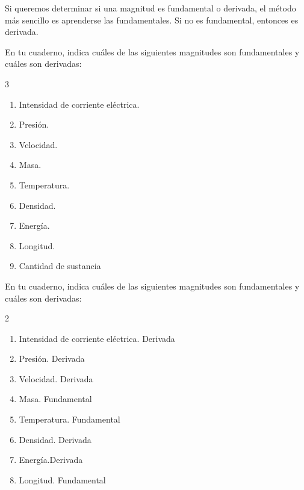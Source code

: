 \begin{remark}
    Si queremos determinar si una magnitud es fundamental o derivada, el método más sencillo es aprenderse las fundamentales.
    Si no es fundamental, entonces es derivada.
\end{remark}

\begin{exercise}
    En tu cuaderno, indica cuáles de las siguientes magnitudes son fundamentales y cuáles son derivadas:
    \vspace*{-12pt}
    \begin{multicols}{3}
        \begin{enumerate}[label=\letraminuscula]
            \item Intensidad de corriente eléctrica.
            \item Presión.
            \item Velocidad.
            \item Masa.
            \item Temperatura.
            \item Densidad.
            \item Energía.
            \item Longitud.
            \item Cantidad de sustancia
        \end{enumerate}
    \end{multicols}
    \begin{solu}
        En tu cuaderno, indica cuáles de las siguientes magnitudes son fundamentales y cuáles son derivadas:
        \begin{multicols}{2}
            \begin{enumerate}[label=\letraminuscula]
            \item Intensidad de corriente eléctrica. \textcolor{ocre}{Derivada}
            \item Presión. \textcolor{ocre}{Derivada}
            \item Velocidad. \textcolor{ocre}{Derivada}
            \item Masa. \textcolor{ocre}{Fundamental}
            \item Temperatura. \textcolor{ocre}{Fundamental}
            \item Densidad. \textcolor{ocre}{Derivada}
            \item Energía.\textcolor{ocre}{Derivada}
            \item Longitud. \textcolor{ocre}{Fundamental}
            \end{enumerate}
        \end{multicols}
    \end{solu}
\end{exercise}

